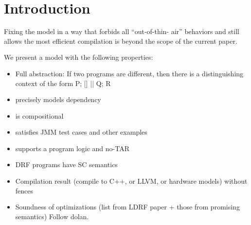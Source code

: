 \section{Introduction}
\label{sec:intro}

Fixing the model in a way that forbids all “out-of-thin- air” behaviors and still allows the most efficient compilation is beyond the scope of the current paper. 

We present a model with the following properties:
\begin{itemize}
  
\item Full abstraction:  If two programs are different, then there is a
  distinguishing context of the form P; [] || Q; R
\item precisely models dependency
\item is compositional
\item satisfies JMM test cases and other examples
\item supports a program logic and no-TAR
\item DRF programs have SC semantics
\item Compilation result (compile to C++, or LLVM, or hardware models) without fences
\item Soundness of optimizations (list from LDRF paper + those from promising
  semantics)  Follow dolan.
\end{itemize}

